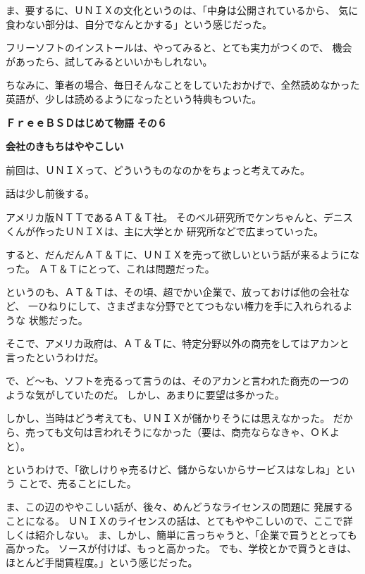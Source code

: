 \documentclass[12pt]{jarticle}
\begin{document}
ま、要するに、ＵＮＩＸの文化というのは、「中身は公開されているから、
気に食わない部分は、自分でなんとかする」という感じだった。

\bigskip

フリーソフトのインストールは、やってみると、とても実力がつくので、
機会があったら、試してみるといいかもしれない。

ちなみに、筆者の場合、毎日そんなことをしていたおかげで、全然読めなかった
英語が、少しは読めるようになったという特典もついた。
\newpage

\noindent
\textbf{\Huge ＦｒｅｅＢＳＤはじめて物語}
\hspace{1cm}
\textbf{\LARGE その６}

\bigskip

\textbf{\large 会社のきもちはややこしい}

\bigskip
\bigskip

前回は、ＵＮＩＸって、どういうものなのかをちょっと考えてみた。

\bigskip

話は少し前後する。

アメリカ版ＮＴＴであるＡＴ＆Ｔ社。
そのベル研究所でケンちゃんと、デニスくんが作ったＵＮＩＸは、主に大学とか
研究所などで広まっていった。

すると、だんだんＡＴ＆Ｔに、ＵＮＩＸを売って欲しいという話が来るようになった。
ＡＴ＆Ｔにとって、これは問題だった。

\bigskip

というのも、ＡＴ＆Ｔは、その頃、超でかい企業で、放っておけば他の会社など、
一ひねりにして、さまざまな分野でとてつもない権力を手に入れられるような
状態だった。

そこで、アメリカ政府は、ＡＴ＆Ｔに、特定分野以外の商売をしてはアカンと
言ったというわけだ。

\bigskip

で、ど〜も、ソフトを売るって言うのは、そのアカンと言われた商売の一つの
ような気がしていたのだ。
しかし、あまりに要望は多かった。

しかし、当時はどう考えても、ＵＮＩＸが儲かりそうには思えなかった。
だから、売っても文句は言われそうになかった（要は、商売ならなきゃ、ＯＫよと）。

というわけで、「欲しけりゃ売るけど、儲からないからサービスはなしね」という
ことで、売ることにした。

\bigskip

ま、この辺のややこしい話が、後々、めんどうなライセンスの問題に
発展することになる。
ＵＮＩＸのライセンスの話は、とてもややこしいので、ここで詳しくは紹介しない。
ま、しかし、簡単に言っちゃうと、「企業で買うととっても高かった。
ソースが付けば、もっと高かった。
でも、学校とかで買うときは、ほとんど手間賃程度。」という感じだった。
\end{document}
